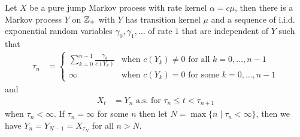 \begin{thm}Let $X$ be a pure jump Markov process with rate kernel
  $\alpha=c\mu$, then there is a Markov process $Y$ on $\mathbb{Z}_+$ with $Y$ has transition kernel $\mu$
  and a
  sequence of i.i.d. exponential random variables $\gamma_0, \gamma_1,
  \dotsc$ of rate $1$ that are independent of $Y$ such that
\begin{align*}
\tau_n &= \begin{cases}
\sum_{k=0}^{n-1} \frac{\gamma_k}{c(Y_k)} &\text{when $c(Y_k)
  \neq 0$ for all $k=0, \dotsc, n-1$} \\
\infty & \text{when $c(Y_k) = 0$ for some $k=0, \dotsc, n-1$}
\end{cases}
\end{align*}
and
\begin{align*}
X_t &= Y_n  \text{ a.s. for $\tau_n \leq t < \tau_{n+1}$}
\end{align*} 
when $\tau_n < \infty$.  If $\tau_n = \infty$ for some $n$ then let
$N = \max \lbrace n \mid \tau_n < \infty \rbrace$, then we have $Y_n =
Y_{N-1} = X_{\tau_{N}}$ for all $n > N$.
\end{thm}
